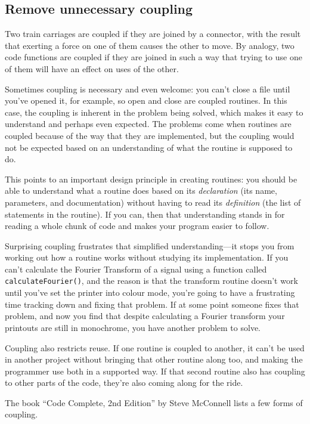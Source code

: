 \documentclass[a4paper]{article}
\begin{document}
\subsection {Remove unnecessary coupling}

Two train carriages are coupled if they are joined by a connector, with the result that exerting a force on one of them causes the other to move.
By analogy, two code functions are coupled if they are joined in such a way that trying to use one of them will have an effect on uses of the other.

Sometimes coupling is necessary and even welcome: you can't close a file until you've opened it, for example, so open and close are coupled routines.
In this case, the coupling is inherent in the problem being solved, which makes it easy to understand and perhaps even expected.
The problems come when routines are coupled because of the way that they are implemented, but the coupling would not be expected based on an understanding of what the routine is supposed to do.

This points to an important design principle in creating routines: you should be able to understand what a routine does based on its \textit{declaration} (its name, parameters, and documentation) without having to read its \textit{definition} (the list of statements in the routine).
If you can, then that understanding stands in for reading a whole chunk of code and makes your program easier to follow.

Surprising coupling frustrates that simplified understanding---it stops you from working out how a routine works without studying its implementation.
If you can't calculate the Fourier Transform of a signal using a function called \texttt{calculateFourier()}, and the reason is that the transform routine doesn't work until you've set the printer into colour mode, you're going to have a frustrating time tracking down and fixing that problem.
If at some point someone fixes that problem, and now you find that despite calculating a Fourier transform your printouts are still in monochrome, you have another problem to solve.

Coupling also restricts reuse.
If one routine is coupled to another, it can't be used in another project without bringing that other routine along too, and making the programmer use both in a supported way.
If that second routine also has coupling to other parts of the code, they're also coming along for the ride.

The book ``Code Complete, 2nd Edition'' by Steve McConnell\cite{cc2e} lists a few forms of coupling.
\end{document}
